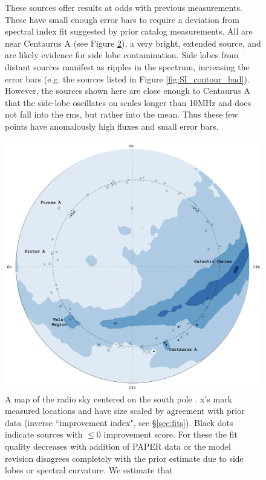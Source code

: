 \documentclass[preprint]{aastex}
\begin{document}
\begin{figure}[htbp]
\begin{center}
\end{center}
\caption{
These sources offer results at odds with previous measurements. These have
small enough error bars to require a deviation from spectral index fit
suggested by prior catalog measurements. All are near Centaurus A (see Figure
\ref{fig:error_map}), a very bright, extended source, and are likely evidence
for side lobe contamination.  Side lobes from distant sources manifest as
ripples in the spectrum, increasing the error bars (e.g. the sources listed in
Figure \ref{fig:SI_contour_bad}). However, the sources shown here are close
enough to Centaurus A that the side-lobe oscillates on scales longer than 10MHz
and does not fall into the rms, but rather into the mean. Thus these few points
have anomalously high fluxes and small error bars. 
} \label{fig:SI_contour_new}
\end{figure}





\begin{figure}
\includegraphics[width=\textwidth]{plots/psa64_pic_strip_positions_annotated_cropped.png}
\caption{
A map of the radio sky centered on the south pole
\citep{deOliveiraCosta:2008p2242}.  x's mark measured locations and have size
scaled by agreement with prior data (inverse ``improvement index", see
\S\ref{sec:fits}). Black dots indicate sources with $\le0$ improvement score.
For these the fit quality decreases with addition of PAPER data or the model
revision disagrees completely with the prior estimate due to side lobes or
spectral curvature.  We estimate that   \label{fig:error_map}
}
\end{figure}
\end{document}
